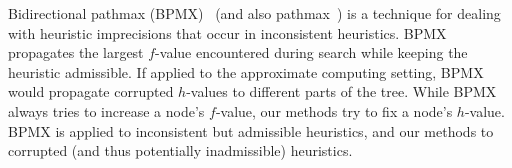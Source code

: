 \documentclass[letterpaper]{article}
\begin{document}
Bidirectional pathmax (BPMX)~\cite{FelnerZHSSZ11} (and also pathmax~\cite{mero1984aHeuristicSearch}) is a technique for dealing with heuristic imprecisions that occur in inconsistent heuristics. BPMX propagates the largest $f$-value encountered during search while keeping the heuristic admissible. If applied to the approximate computing setting, BPMX would propagate corrupted $h$-values to different parts of the tree. While BPMX always tries to increase a node's $f$-value, our methods try to fix a node's $h$-value. %
BPMX is applied to inconsistent but admissible heuristics, 
and our methods to corrupted (and thus potentially inadmissible) heuristics. 










\end{document}
